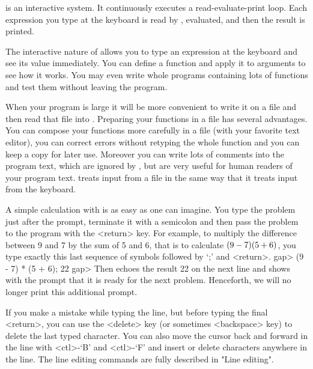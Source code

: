 \null

%
{\GAP}  is  an   interactive   system.    It  continuously   executes   a
read-evaluate-print loop.  Each  expression you type  at the  keyboard is
read by {\GAP}, evaluated, and then the result is printed.

The interactive nature of {\GAP} allows you to type  an expression at the
keyboard and see its value immediately.  You can  define a  function  and
apply it to arguments  to  see how  it  works.  You may  even write whole
programs containing lots  of functions and test them without leaving  the
program.

When  your program is large it  will be more  convenient to write it on a
file and then read that file  into {\GAP}. Preparing  your functions in a
file   has  several advantages.  You  can   compose  your functions  more
carefully in a  file (with your favorite  text  editor), you can  correct
errors without retyping  the whole function and you  can keep a  copy for
later use. Moreover you can write lots of comments into the program text,
which are ignored  by {\GAP}, but are   very useful for  human readers of
your program text. {\GAP} treats  input from a  file in the same way that
it treats input from the keyboard.

A simple calculation with {\GAP} is as easy as one can imagine.  You type
the problem just after the prompt, terminate it with a semicolon and then
pass the problem to the  program with the <return> key.  For  example, to
multiply the difference between 9 and 7 by the sum of 5 and 6, that is to
calculate  $(9 - 7) \* (5 + 6)$, you type exactly this  last sequence  of
symbols followed by `;' and <return>.
\beginexample
    gap> (9 - 7) * (5 + 6);
    22
    gap> 
\endexample
Then {\GAP} echoes   the result 22 on the   next line and shows with  the
prompt  that it is ready  for the  next problem.  Henceforth,  we will no
longer print this additional prompt.

%
If you make a mistake while typing the  line, but before typing the final
<return>, you can use the <delete> key  (or sometimes <backspace> key) to
delete the last typed  character. You can  also move the cursor  back and
forward  in the line  with <ctl>-`B' and  <ctl>-`F' and  insert or delete
characters  anywhere  in the line.  The  line editing  commands are fully
described in "Line editing".

